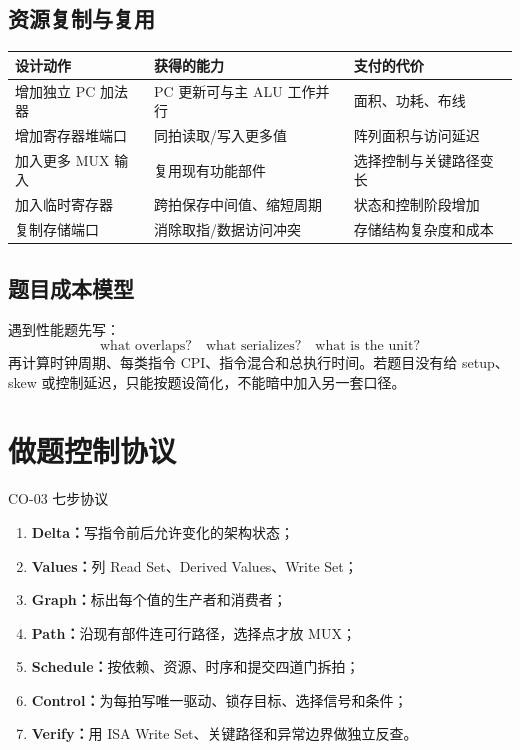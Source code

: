 \documentclass[UTF8,fontset=fandol,11pt,a4paper]{ctexart}
\newcommand{\kw}[1]{\textbf{\color{deep}#1}}
\begin{document}
\subsection{资源复制与复用}

\begin{center}
\small
\begin{tabularx}{\linewidth}{L{3.0cm}YY}
\toprule
设计动作 & 获得的能力 & 支付的代价 \\
\midrule
增加独立 PC 加法器 & PC 更新可与主 ALU 工作并行 & 面积、功耗、布线 \\
增加寄存器堆端口 & 同拍读取/写入更多值 & 阵列面积与访问延迟 \\
加入更多 MUX 输入 & 复用现有功能部件 & 选择控制与关键路径变长 \\
加入临时寄存器 & 跨拍保存中间值、缩短周期 & 状态和控制阶段增加 \\
复制存储端口 & 消除取指/数据访问冲突 & 存储结构复杂度和成本 \\
\bottomrule
\end{tabularx}
\end{center}

\subsection{题目成本模型}

遇到性能题先写：
\[
\text{what overlaps?}
\quad
\text{what serializes?}
\quad
\text{what is the unit?}
\]
再计算时钟周期、每类指令 CPI、指令混合和总执行时间。若题目没有给 setup、skew 或控制延迟，只能按题设简化，不能暗中加入另一套口径。

\section{做题控制协议}

\begin{corebox}{CO-03 七步协议}
\begin{enumerate}
  \item \kw{Delta：}写指令前后允许变化的架构状态；
  \item \kw{Values：}列 Read Set、Derived Values、Write Set；
  \item \kw{Graph：}标出每个值的生产者和消费者；
  \item \kw{Path：}沿现有部件连可行路径，选择点才放 MUX；
  \item \kw{Schedule：}按依赖、资源、时序和提交四道门拆拍；
  \item \kw{Control：}为每拍写唯一驱动、锁存目标、选择信号和条件；
  \item \kw{Verify：}用 ISA Write Set、关键路径和异常边界做独立反查。
\end{enumerate}
\end{corebox}
\end{document}
